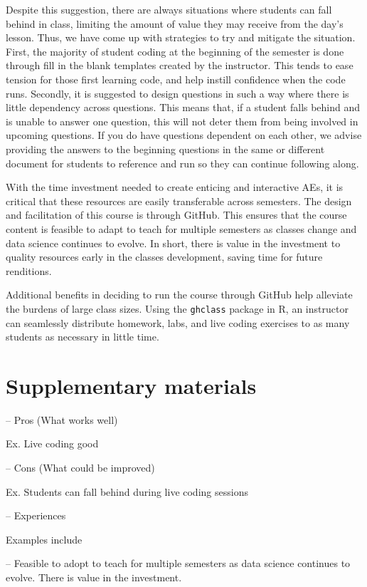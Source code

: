 \documentclass[
  12pt]{article}
\begin{document}
Despite this suggestion, there are always situations where students can
fall behind in class, limiting the amount of value they may receive from
the day's lesson. Thus, we have come up with strategies to try and
mitigate the situation. First, the majority of student coding at the
beginning of the semester is done through fill in the blank templates
created by the instructor. This tends to ease tension for those first
learning code, and help instill confidence when the code runs. Secondly,
it is suggested to design questions in such a way where there is little
dependency across questions. This means that, if a student falls behind
and is unable to answer one question, this will not deter them from
being involved in upcoming questions. If you do have questions dependent
on each other, we advise providing the answers to the beginning
questions in the same or different document for students to reference
and run so they can continue following along.

With the time investment needed to create enticing and interactive AEs,
it is critical that these resources are easily transferable across
semesters. The design and facilitation of this course is through GitHub.
This ensures that the course content is feasible to adapt to teach for
multiple semesters as classes change and data science continues to
evolve. In short, there is value in the investment to quality resources
early in the classes development, saving time for future renditions.

Additional benefits in deciding to run the course through GitHub help
alleviate the burdens of large class sizes. Using the \texttt{ghclass}
package in R, an instructor can seamlessly distribute homework, labs,
and live coding exercises to as many students as necessary in little
time.

\hypertarget{supplementary-materials}{%
\section{Supplementary materials}\label{supplementary-materials}}

-- Pros (What works well)

Ex. Live coding good

-- Cons (What could be improved)

Ex. Students can fall behind during live coding sessions

-- Experiences

Examples include

-- Feasible to adopt to teach for multiple semesters as data science
continues to evolve. There is value in the investment.
\end{document}
